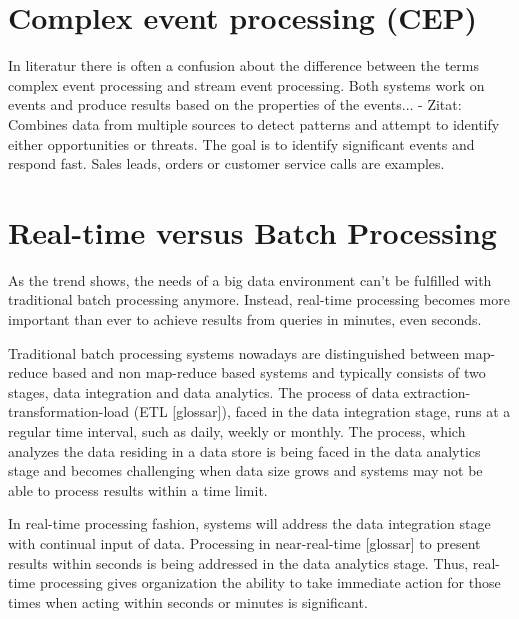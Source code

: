 \section{Complex event processing (CEP)}
In literatur there is often a confusion about the difference between the terms
complex event processing and stream event processing. Both systems work on
events and produce results based on the properties of the events... 
- Zitat: Combines data from multiple sources  to detect patterns and attempt to
identify either opportunities or threats. The goal is to identify significant
events and respond fast. Sales leads, orders or customer service calls are
examples.\\


\section{Real-time versus Batch Processing}

As the trend shows, the needs of a big data environment can't be fulfilled with 
traditional batch processing anymore. Instead, real-time processing becomes more 
important than ever to achieve results from queries in minutes, even seconds. 
\cite{bange2013big}


Traditional batch processing systems nowadays are distinguished between
map-reduce based and non map-reduce based systems and typically consists of two
stages, data integration and data analytics. The process of data
extraction-transformation-load (ETL  [glossar]), faced in the data integration
stage, runs at a regular time interval, such as daily, weekly or monthly. The
process, which analyzes the data residing in a data store is being faced in the
data analytics stage and becomes challenging when data size grows and systems
may not be able to process results within a time limit.
\cite{Liu:2014:SRP:2628194.2628251}

In real-time processing fashion, systems will address the data integration stage
with continual input of data. Processing in near-real-time [glossar] to present 
results within seconds is being addressed in the data analytics stage. Thus,
real-time processing gives organization the ability to take immediate action
for those times when acting within seconds or minutes is significant.
\cite{PrpSvyOfDSPS}

